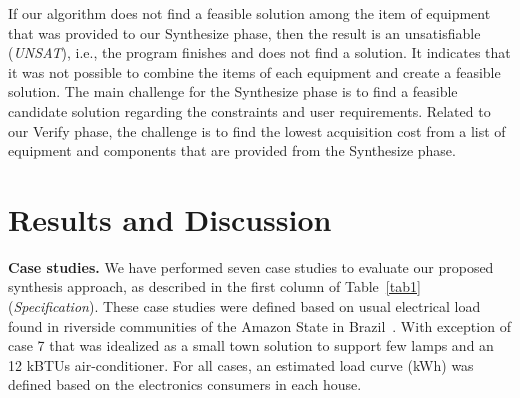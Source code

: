 \documentclass[runningheads]{llncs}
\begin{document}
If our algorithm does not find a feasible solution among the item of equipment that was provided to our {\sc Synthesize} phase, then the result is an unsatisfiable (\textit{UNSAT}), i.e., the program finishes and does not find a solution. It indicates that it was not possible to combine the items of each equipment and create a feasible solution. The main challenge for the {\sc Synthesize} phase is to find a feasible candidate solution regarding the constraints and user requirements. Related to our {\sc Verify} phase, the challenge is to find the lowest acquisition cost from a list of equipment and components that are provided from the {\sc Synthesize} phase. 

\section{Results and Discussion}
\textbf{Case studies.} We have performed seven case studies to evaluate our proposed synthesis approach, as described in the first column of Table~\ref{tab1} 
(\textit{Specification}). These case studies were defined based on usual electrical load found in riverside communities of the Amazon State in Brazil~\cite{TrindadeCordeiro19,Agrener2013}. With exception of case 7 that was idealized as a small town solution to support few lamps and an 12 kBTUs air-conditioner. For all cases, an estimated load curve (kWh) was defined based on the electronics consumers in each house.
\end{document}
